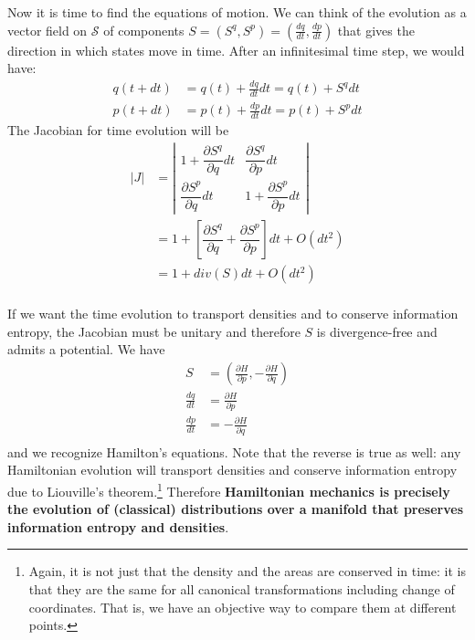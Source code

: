 \documentclass[11pt]{elsarticle}
\begin{document}
Now it is time to find the equations of motion. We can think of the evolution as a vector field on $\mathcal{S}$ of components $S = (S^q, S^p) = (\frac{dq}{dt}, \frac{dp}{dt})$ that gives the direction in which states move in time. After an infinitesimal time step, we would have:
\begin{equation}
\begin{aligned}
q(t+dt) &= q(t) + \frac{dq}{dt} dt = q(t) + S^q dt \\
p(t+dt) &= p(t) + \frac{dp}{dt} dt = p(t) + S^p dt
\end{aligned}
\end{equation}
The Jacobian for time evolution will be
\begin{equation}
\label{Jacobian_evolution}
\begin{aligned}
|J| &= \left| \begin{matrix}
1 + \dfrac{\partial S^q}{\partial q}dt & \dfrac{\partial S^q}{\partial p} dt \\[2.2ex]
\dfrac{\partial S^p}{\partial q}  dt & 1 + \dfrac{\partial S^p}{\partial p} dt \end{matrix} \right| \\
&= 1 + \left[ \dfrac{\partial S^q}{\partial q} + \dfrac{\partial S^p}{\partial p} \right]dt + O(dt^2)\\
&= 1 + div(S)dt + O(dt^2)\\
\end{aligned}
\end{equation}

If we want the time evolution to transport  densities and to conserve information entropy, the Jacobian must be unitary and therefore $S$ is divergence-free and admits a potential. We have
\begin{equation}
\label{Potential_Hamilton}
\begin{aligned}
S &= \left(\frac{\partial H}{\partial p}, - \frac{\partial H}{\partial q}\right) \\
\frac{dq}{dt} &= \frac{\partial H}{\partial p}  \\
\frac{dp}{dt} &= - \frac{\partial H}{\partial q}  \\
\end{aligned}
\end{equation}
and we recognize Hamilton's equations. Note that the reverse is true as well: any Hamiltonian evolution will transport densities and conserve information entropy due to Liouville's theorem.\footnote{Again, it is not just that the density and the areas are conserved in time: it is that they are the same for all canonical transformations including change of coordinates. That is, we have an objective way to compare them at different points.} Therefore \textbf{Hamiltonian mechanics is precisely the evolution of (classical) distributions over a manifold that preserves information entropy and densities}.
\end{document}

